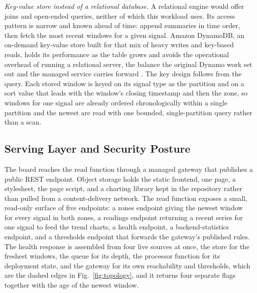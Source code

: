 \documentclass[conference]{IEEEtran}
\begin{document}
\textit{Key-value store instead of a relational database.} A relational engine would offer joins and open-ended queries, neither of which this workload uses. Its access pattern is narrow and known ahead of time: append summaries in time order, then fetch the most recent windows for a given signal. Amazon DynamoDB, an on-demand key-value store built for that mix of heavy writes and key-based reads, holds its performance as the table grows and avoids the operational overhead of running a relational server, the balance the original Dynamo work set out and the managed service carries forward \cite{decandia2007, elhemali2022}. The key design follows from the query. Each stored window is keyed on its signal type as the partition and on a sort value that leads with the window's closing timestamp and then the zone, so windows for one signal are already ordered chronologically within a single partition and the newest are read with one bounded, single-partition query rather than a scan.

\subsection{Serving Layer and Security Posture}

The board reaches the read function through a managed gateway that publishes a public REST endpoint. Object storage holds the static frontend, one page, a stylesheet, the page script, and a charting library kept in the repository rather than pulled from a content-delivery network. The read function exposes a small, read-only surface of five endpoints: a zones endpoint giving the newest window for every signal in both zones, a readings endpoint returning a recent series for one signal to feed the trend charts, a health endpoint, a backend-statistics endpoint, and a thresholds endpoint that forwards the gateway's published rules. The health response is assembled from four live sources at once, the store for the freshest windows, the queue for its depth, the processor function for its deployment state, and the gateway for its own reachability and thresholds, which are the dashed edges in Fig.~\ref{fig:topology}, and it returns four separate flags together with the age of the newest window.
\end{document}
